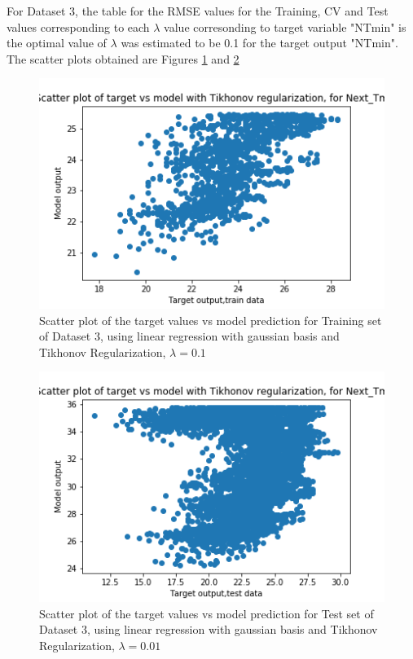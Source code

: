 \documentclass[12pt,a4paper]{article}
\newcommand{\noi}{\noindent}
\begin{document}
 \noi
For Dataset 3, the table for the RMSE values for the Training, CV and Test values corresponding to each $\lambda$ value corresonding to target variable "NTmin" is\\


\noi
the optimal value of $\lambda$ was estimated to be 0.1 for the target output "NTmin". The scatter plots obtained are Figures \ref{fig:tikhds3tr} and \ref{fig:tikhds3t}
\begin{figure}[H]
     \centering
     \includegraphics[scale=0.5]{images/scatter_ds3tikhtrainT_min.png}
     \caption{Scatter plot of the target values vs model prediction for Training set of Dataset 3, using linear regression with gaussian basis and Tikhonov Regularization, $\lambda = 0.1 $}
     \label{fig:tikhds3tr}
\end{figure}
\begin{figure}[H]
     \centering
     \includegraphics[scale=0.5]{images/scatter_ds3tikhtestT_min.png}
     \caption{Scatter plot of the target values vs model prediction for Test set of Dataset 3, using linear regression with gaussian basis and Tikhonov Regularization, $\lambda = 0.01 $}
     \label{fig:tikhds3t}
\end{figure}
\end{document}
